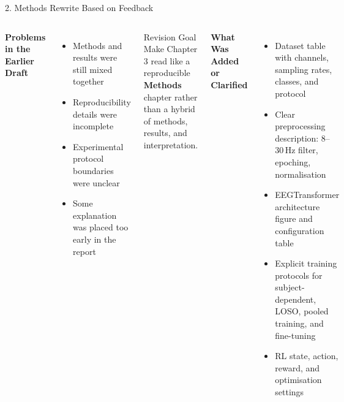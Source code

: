 \documentclass[aspectratio=169, 11pt]{beamer}
\begin{document}
\begin{frame}[shrink=7]{2. Methods Rewrite Based on Feedback}

    \begin{columns}[T]
        \textbf{Problems in the Earlier Draft}
        \begin{itemize}
            \item Methods and results were still mixed together
            \item Reproducibility details were incomplete
            \item Experimental protocol boundaries were unclear
            \item Some explanation was placed too early in the report
        \end{itemize}

        \vspace{2mm}
        \begin{alertblock}{Revision Goal}
            Make Chapter 3 read like a reproducible \textbf{Methods} chapter rather than a hybrid of methods, results, and interpretation.
        \end{alertblock}

        \textbf{What Was Added or Clarified}
        \begin{itemize}
            \item Dataset table with channels, sampling rates, classes, and protocol
            \item Clear preprocessing description: 8--30\,Hz filter, epoching, normalisation
            \item EEGTransformer architecture figure and configuration table
            \item Explicit training protocols for subject-dependent, LOSO, pooled training, and fine-tuning
            \item RL state, action, reward, and optimisation settings
        \end{itemize}
    \end{columns}
\end{frame}
\end{document}
